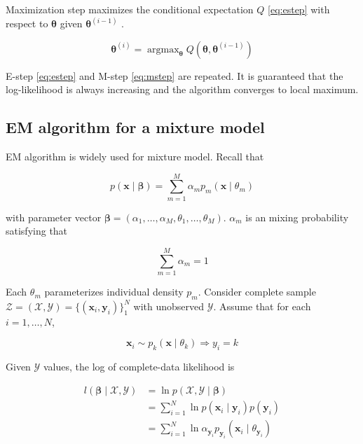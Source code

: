 \documentclass[]{book}
\DeclareMathOperator*{\argmax}{argmax}
\theoremstyle{definition}
\theoremstyle{definition}
\theoremstyle{definition}
\theoremstyle{remark}
\begin{document}
Maximization step maximizes the conditional expectation \(Q\) \eqref{eq:estep} with respect to \(\boldsymbol\theta\) given \(\boldsymbol\theta^{(i - 1)}\) \citep{Rizzo:2007aa}.

\begin{equation}
  \boldsymbol\theta^{(i)} = \argmax_{\boldsymbol\theta} Q(\boldsymbol\theta, \boldsymbol\theta^{(i - 1)})
  \label{eq:mstep}
\end{equation}

E-step \eqref{eq:estep} and M-step \eqref{eq:mstep} are repeated. It is guaranteed that the log-likelihood is always increasing and the algorithm converges to local maximum.

\hypertarget{em-algorithm-for-a-mixture-model}{%
\subsection{EM algorithm for a mixture model}\label{em-algorithm-for-a-mixture-model}}

EM algorithm is widely used for mixture model. Recall that

\[p(\mathbf{x} \mid \boldsymbol\beta) = \sum_{m = 1}^M \alpha_m p_m(\mathbf{x} \mid \theta_m)\]

with parameter vector \(\boldsymbol\beta = (\alpha_1, \ldots, \alpha_M, \theta_1, \ldots, \theta_M)\). \(\alpha_m\) is an mixing probability satisfying that

\[\sum_{m = 1}^M \alpha_m = 1\]

Each \(\theta_m\) parameterizes individual density \(p_m\). Consider complete sample \(\mathcal{Z} = (\mathcal{X}, \mathcal{Y}) = \{ (\mathbf{x}_i, \mathbf{y}_i) \}_1^N\) with unobserved \(\mathcal{Y}\). Assume that for each \(i = 1, \ldots, N\),

\[\mathbf{x}_i \sim p_k(\mathbf{x} \mid \theta_k) \Rightarrow y_i = k\]

Given \(\mathcal{Y}\) values, the log of complete-data likelihood is

\begin{equation}
  \begin{split}
    l(\boldsymbol\beta \mid \mathcal{X}, \mathcal{Y}) & = \ln p(\mathcal{X}, \mathcal{Y} \mid \boldsymbol\beta) \\
    & = \sum_{i = 1}^N \ln p(\mathbf{x}_i \mid \mathbf{y}_i) p(\mathbf{y}_i) \\
    & = \sum_{i = 1}^N \ln \alpha_{\mathbf{y}_i} p_{\mathbf{y}_i}(\mathbf{x}_i \mid \theta_{\mathbf{y}_i})
  \end{split}
  \label{eq:logmix}
\end{equation}
\end{document}
